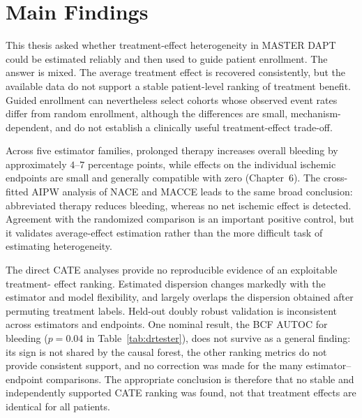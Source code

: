 
\section{Main Findings}

This thesis asked whether treatment-effect heterogeneity in MASTER DAPT could be
estimated reliably and then used to guide patient enrollment. The answer is mixed. The
average treatment effect is recovered consistently, but the available data do not
support a stable patient-level ranking of treatment benefit. Guided enrollment can
nevertheless select cohorts whose observed event rates differ from random enrollment,
although the differences are small, mechanism-dependent, and do not establish a
clinically useful treatment-effect trade-off.

\vspace{10pt}

Across five estimator families, prolonged therapy increases overall bleeding by
approximately $4$--$7$ percentage points, while effects on the individual ischemic
endpoints are small and generally compatible with zero (Chapter~6). The cross-fitted
AIPW analysis of NACE and MACCE leads to the same broad conclusion: abbreviated therapy
reduces bleeding, whereas no net ischemic effect is detected. Agreement with the
randomized comparison is an important positive control, but it validates average-effect
estimation rather than the more difficult task of estimating heterogeneity.

\vspace{10pt}

The direct CATE analyses provide no reproducible evidence of an exploitable treatment-
effect ranking. Estimated dispersion changes markedly with the estimator and model
flexibility, and largely overlaps the dispersion obtained after permuting treatment
labels. Held-out doubly robust validation is inconsistent across estimators and
endpoints. One nominal result, the BCF AUTOC for bleeding ($p=0.04$ in
Table~\ref{tab:drtester}), does not survive as a general finding: its sign is not shared
by the causal forest, the other ranking metrics do not provide consistent support, and
no correction was made for the many estimator--endpoint comparisons. The appropriate
conclusion is therefore that no stable and independently supported CATE ranking was
found, not that treatment effects are identical for all patients.

\vspace{10pt}

